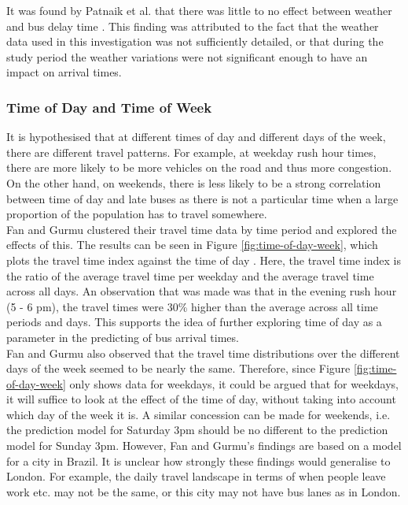 It was found by Patnaik et al. that there was little to no effect between weather and bus delay time \cite{apc-estimation}. This finding was attributed to the fact that the weather data used in this investigation was not sufficiently detailed, or that during the study period the weather variations were not significant enough to have an impact on arrival times. 

\subsubsection{Time of Day and Time of Week}

It is hypothesised that at different times of day and different days of the week, there are different travel patterns. For example, at weekday rush hour times, there are more likely to be more vehicles on the road and thus more congestion. On the other hand, on weekends, there is less likely to be a strong correlation between time of day and late buses as there is not a particular time when a large proportion of the population has to travel somewhere. \\

Fan and Gurmu clustered their travel time data by time period and explored the effects of this. The results can be seen in Figure \ref{fig:time-of-day-week}, which plots the travel time index against the time of day \cite{dynamic-gps}. Here, the travel time index is the ratio of the average travel time per weekday and the average travel time across all days. An observation that was made was that in the evening rush hour (5 - 6 pm), the travel times were 30\% higher than the average across all time periods and days. This supports the idea of further exploring time of day as a parameter in the predicting of bus arrival times. \\

Fan and Gurmu also observed that the travel time distributions over the different days of the week seemed to be nearly the same. Therefore, since Figure \ref{fig:time-of-day-week} only shows data for weekdays, it could be argued that for weekdays, it will suffice to look at the effect of the time of day, without taking into account which day of the week it is. A similar concession can be made for weekends, i.e. the prediction model for Saturday 3pm should be no different to the prediction model for Sunday 3pm. However, Fan and Gurmu's findings are based on a model for a city in Brazil. It is unclear how strongly these findings would generalise to London. For example, the daily travel landscape in terms of when people leave work etc. may not be the same, or this city may not have bus lanes as in London.

